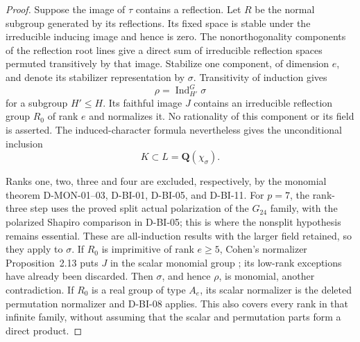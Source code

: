 \begin{proof}
Suppose the image of $\tau$ contains a reflection.  Let $R$ be
the normal subgroup generated by its reflections.  Its fixed space
is stable under the irreducible inducing image and hence is zero.
The nonorthogonality components of the reflection root lines give
a direct sum of irreducible reflection spaces permuted transitively
by that image.  Stabilize one component, of dimension $e$, and
denote its stabilizer representation by $\sigma$.  Transitivity
of induction gives
\[
                    \rho=\operatorname{Ind}_{H'}^G\sigma
\]
for a subgroup $H'\le H$.  Its faithful image $J$ contains an
irreducible reflection group $R_0$ of rank $e$ and normalizes it.
No rationality of this component or its field is asserted.  The
induced-character formula nevertheless gives the unconditional
inclusion
\[
                    K\subset L=\mathbf Q(\chi_\sigma).
                                                               \tag{BI.39}
\]

Ranks one, two, three and four are excluded, respectively, by
the monomial theorem D-MON-01--03, D-BI-01, D-BI-05, and
D-BI-11.  For $p=7$, the rank-three step uses the proved split
actual polarization of the $G_{24}$ family, with the polarized
Shapiro comparison in D-BI-05; this is where the nonsplit
hypothesis remains essential.  These are all-induction results with the larger field
retained, so they apply to $\sigma$.
If $R_0$ is imprimitive of rank $e\ge5$, Cohen's normalizer
Proposition~2.13 puts $J$ in the scalar monomial group
\cite[pp.~391--392]{FIELD:Cohen}; its low-rank exceptions have
already been discarded.  Then $\sigma$, and hence $\rho$, is
monomial, another contradiction.  If $R_0$ is a real group of
type $A_e$, its scalar normalizer is the deleted permutation
normalizer and D-BI-08 applies.  This also covers every rank in
that infinite family, without assuming that the scalar and
permutation parts form a direct product.


\end{proof}
